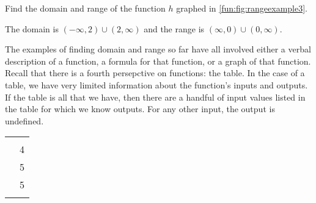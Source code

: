 \begin{doyouunderstand}
	\begin{problem}
	Find the domain and range of the function $h$ graphed in \cref{fun:fig:rangeexample3}.
	\begin{shortsolution}
		The domain is $(-\infty,2)\cup(2,\infty)$ and the range is $(\infty,0)\cup(0,\infty)$.
	\end{shortsolution}
	\end{problem}
\end{doyouunderstand}

The examples of finding domain and range so far have all involved either a verbal description of a function, a formula for that function, or a graph of that function. Recall that there is a fourth persepctive on functions: the table. In the case of a table, we have very limited information about the function's inputs and outputs. If the table is all that we have, then there are a handful of input values listed in the table for which we know outputs. For any other input, the output is undefined. 

\begin{margintable}
	\centering
	\label{fun:tab:rangetable}
	\begin{tabular}{SS}
		\beforeheading
		 &  \\
		             & 4                \\              & 5                \\             & 5                \\\lastline
	\end{tabular}
\end{margintable}
\begin{marginfigure}
	\centering
	\label{fun:fig:rangetable}
\end{marginfigure}

